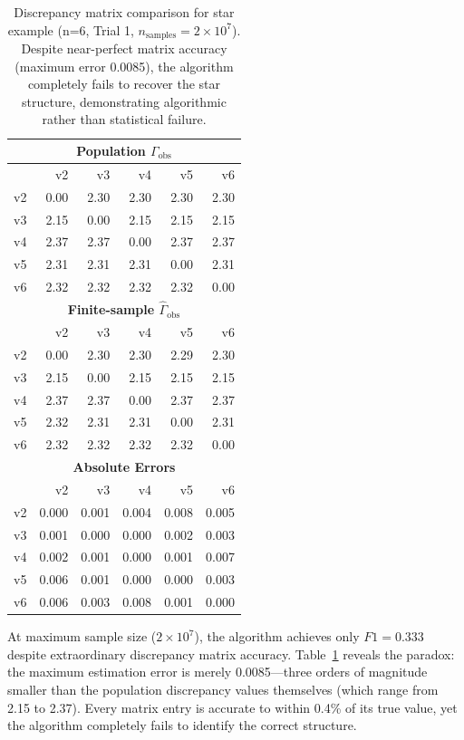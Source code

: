 \documentclass[11pt,a4paper]{article}
\numberwithin{equation}{section}
\begin{document}
\begin{table}[h]
\centering
\caption{Discrepancy matrix comparison for star example (n=6, Trial 1, $n_{\text{samples}} = 2 \times 10^7$). Despite near-perfect matrix accuracy (maximum error 0.0085), the algorithm completely fails to recover the star structure, demonstrating algorithmic rather than statistical failure.}
\label{tab:star_example}
\small
\begin{tabular}{l|rrrrr}
\toprule
\multicolumn{6}{c}{\textbf{Population $\Gamma_{\text{obs}}$}} \\
\midrule
& v2 & v3 & v4 & v5 & v6 \\
\midrule
v2 & 0.00 & 2.30 & 2.30 & 2.30 & 2.30 \\
v3 & 2.15 & 0.00 & 2.15 & 2.15 & 2.15 \\
v4 & 2.37 & 2.37 & 0.00 & 2.37 & 2.37 \\
v5 & 2.31 & 2.31 & 2.31 & 0.00 & 2.31 \\
v6 & 2.32 & 2.32 & 2.32 & 2.32 & 0.00 \\
\midrule[1.5pt]
\multicolumn{6}{c}{\textbf{Finite-sample $\hat{\Gamma}_{\text{obs}}$}} \\
\midrule
& v2 & v3 & v4 & v5 & v6 \\
\midrule
v2 & 0.00 & 2.30 & 2.30 & 2.29 & 2.30 \\
v3 & 2.15 & 0.00 & 2.15 & 2.15 & 2.15 \\
v4 & 2.37 & 2.37 & 0.00 & 2.37 & 2.37 \\
v5 & 2.32 & 2.31 & 2.31 & 0.00 & 2.31 \\
v6 & 2.32 & 2.32 & 2.32 & 2.32 & 0.00 \\
\midrule[1.5pt]
\multicolumn{6}{c}{\textbf{Absolute Errors}} \\
\midrule
& v2 & v3 & v4 & v5 & v6 \\
\midrule
v2 & 0.000 & 0.001 & 0.004 & 0.008 & 0.005 \\
v3 & 0.001 & 0.000 & 0.000 & 0.002 & 0.003 \\
v4 & 0.002 & 0.001 & 0.000 & 0.001 & 0.007 \\
v5 & 0.006 & 0.001 & 0.000 & 0.000 & 0.003 \\
v6 & 0.006 & 0.003 & 0.008 & 0.001 & 0.000 \\
\bottomrule
\end{tabular}
\end{table}

At maximum sample size ($2 \times 10^7$), the algorithm achieves only $F1 = 0.333$ despite extraordinary discrepancy matrix accuracy. Table~\ref{tab:star_example} reveals the paradox: the maximum estimation error is merely 0.0085—three orders of magnitude smaller than the population discrepancy values themselves (which range from 2.15 to 2.37). Every matrix entry is accurate to within 0.4\% of its true value, yet the algorithm completely fails to identify the correct structure.
\end{document}
